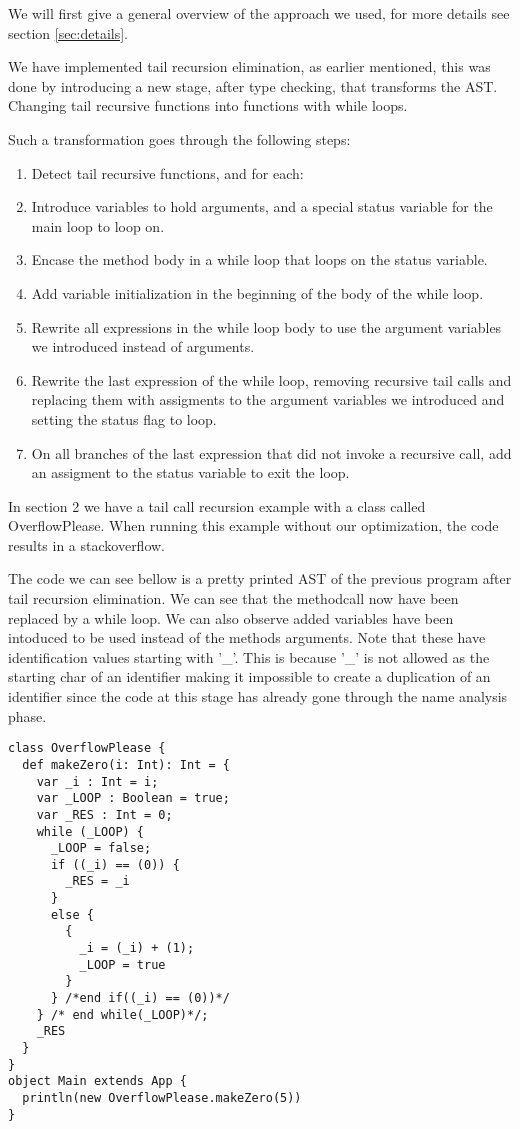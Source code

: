 \label{implementation} We will first give a general overview of the approach we used, for more details see section \ref{sec:details}.

We have implemented tail recursion elimination, as earlier mentioned, this was done by introducing a new stage, after type checking, that transforms the AST. Changing tail recursive functions into functions with while loops.

Such a transformation goes through the following steps:

\begin{enumerate}
    \item Detect tail recursive functions, and for each:
    \item Introduce variables to hold arguments, and a special status variable for the main loop to loop on.
    \item Encase the method body in a while loop that loops on the status variable.
    \item Add variable initialization in the beginning of the body of the while loop.
    \item Rewrite all expressions in the while loop body to use the argument variables we introduced instead of arguments. 
    \item Rewrite the last expression of the while loop, removing recursive tail calls and replacing them with assigments to the argument variables we introduced and setting the status flag to loop.
    \item On all branches of the last expression that did not invoke a recursive call, add an assigment to the status variable to exit the loop.
\end{enumerate}

In section 2 we have a tail call recursion example with a class called OverflowPlease. When running this example without our optimization, the code results in a stackoverflow.

The code we can see bellow is a pretty printed AST of the previous program after tail recursion elimination. We can see that the methodcall now have been replaced by a while loop. We can also observe added variables have been intoduced to be used instead of the methods arguments. Note that these have identification values starting with '\_'. This is because '\_' is not allowed as the starting char of an identifier making it impossible to create a duplication of an identifier since the code at this stage has already gone through the name analysis phase. 
\begin{lstlisting}
class OverflowPlease {
  def makeZero(i: Int): Int = {
    var _i : Int = i;
    var _LOOP : Boolean = true;
    var _RES : Int = 0;
    while (_LOOP) {
      _LOOP = false;
      if ((_i) == (0)) {
        _RES = _i
      }
      else {
        {
          _i = (_i) + (1);
          _LOOP = true
        }
      } /*end if((_i) == (0))*/
    } /* end while(_LOOP)*/;
    _RES
  }
}
object Main extends App {
  println(new OverflowPlease.makeZero(5)) 
}
\end{lstlisting}



